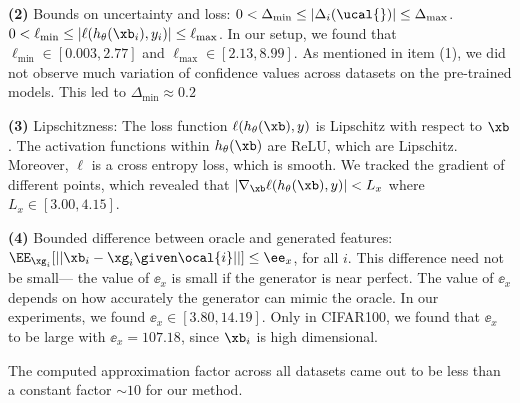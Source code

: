 \documentclass[letterpaper]{article}
\begin{document}
\textbf{(2)} Bounds on uncertainty and loss:
$0< \Delta_{\min} \le |\Delta_i(\ucal{})| \le \Delta_{\max} $.
$ 0< \ell_{\min} \le |\ell(h_\theta(\xb_i),y_i)| \le \ell_{\max}$.
In our setup, we found that $\ell_{\min} \in [0.003, 2.77]$ and  $\ell_{\max} \in [2.13, 8.99]$. As mentioned in item (1), we did not observe much variation of confidence values across datasets on the pre-trained models. This led to $\Delta_{\min}\approx 0.2$

\textbf{(3)} Lipschitzness: The loss function $\ell(h_\theta(\xb),y)$ is Lipschitz with respect to $\xb$. The activation functions within $h_{\theta}(\xb)$
are ReLU, which are Lipschitz. Moreover, $\ell$ is a  cross entropy loss, which is smooth. We tracked the gradient of different points, which revealed that $|\nabla_{\xb}\ell(h_\theta(\xb),y)|< L_x$ where $L_x \in [{3.00}, 4.15]$.

\textbf{(4)} Bounded difference between oracle and generated features: $\EE_{\xg_i}[||\xb_i-\xg_i \given \ocal{i}||] \le \ee_x$, for all $i$.  This difference need not be small--- the value of $\ee_x$ is small if the generator is near perfect.  The value of $\ee_x$ depends on how accurately the generator can mimic the oracle.  In our experiments, we found $\ee_x \in [3.80,14.19]$. Only in CIFAR100, we found that $\ee_x$ to be large with $\ee_x =  107.18$, since $\xb_i$ is high dimensional.

The computed approximation factor across all datasets came out to be less than a constant factor $\sim 10$ for our method.


\end{document}
